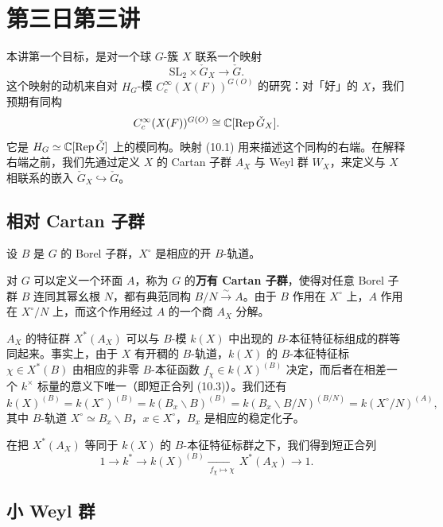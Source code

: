 \section{第三日第三讲}

本讲第一个目标，是对一个球 $G$-簇 $X$ 联系一个映射
\begin{equation}
  \mathrm{SL}_2\times\check G_X\to\check G.
  \label{eq:10-1}
\end{equation}
这个映射的动机来自对 $H_G$-模 $C_c^\infty(X(F))^{G(O)}$ 的研究：对「好」的 $X$，我们预期有同构
\begin{equation}
  C_c^\infty(X(F))^{G(O)}\cong\mathbb C[\operatorname{Rep}\check G_X].
  \label{eq:10-2}
\end{equation}
它是 $H_G\simeq\mathbb C[\operatorname{Rep}\check G]$ 上的模同构。映射 (10.1) 用来描述这个同构的右端。在解释右端之前，我们先通过定义 $X$ 的 Cartan 子群 $A_X$ 与 Weyl 群 $W_X$，来定义与 $X$ 相联系的嵌入 $\check G_X\hookrightarrow\check G$。

\subsection{相对 Cartan 子群}

设 $B$ 是 $G$ 的 Borel 子群，$X^\circ$ 是相应的开 $B$-轨道。

对 $G$ 可以定义一个环面 $A$，称为 $G$ 的\textbf{万有 Cartan 子群}，使得对任意 Borel 子群 $B$ 连同其幂幺根 $N$，都有典范同构 $B/N\xrightarrow{\sim}A$。由于 $B$ 作用在 $X^\circ$ 上，$A$ 作用在 $X^\circ/N$ 上，而这个作用经过 $A$ 的一个商 $A_X$ 分解。

$A_X$ 的特征群 $X^*(A_X)$ 可以与 $B$-模 $k(X)$ 中出现的 $B$-本征特征标组成的群等同起来。事实上，由于 $X$ 有开稠的 $B$-轨道，$k(X)$ 的 $B$-本征特征标 $\chi\in X^*(B)$ 由相应的非零 $B$-本征函数 $f_\chi\in k(X)^{(B)}$ 决定，而后者在相差一个 $k^\times$ 标量的意义下唯一（即短正合列 (10.3)）。我们还有
\[
  k(X)^{(B)}=k(X^\circ)^{(B)}=k(B_x\backslash B)^{(B)}=k(B_x\backslash B/N)^{(B/N)}=k(X^\circ/N)^{(A)},
\]
其中 $B$-轨道 $X^\circ\simeq B_x\backslash B$，$x\in X^\circ$，$B_x$ 是相应的稳定化子。

在把 $X^*(A_X)$ 等同于 $k(X)$ 的 $B$-本征特征标群之下，我们得到短正合列
\begin{equation}
  1\to k^*\to k(X)^{(B)}\xrightarrow[\ f_\chi\mapsto\chi\ ]{}X^*(A_X)\to 1.
  \label{eq:10-3}
\end{equation}

\subsection{小 Weyl 群}

